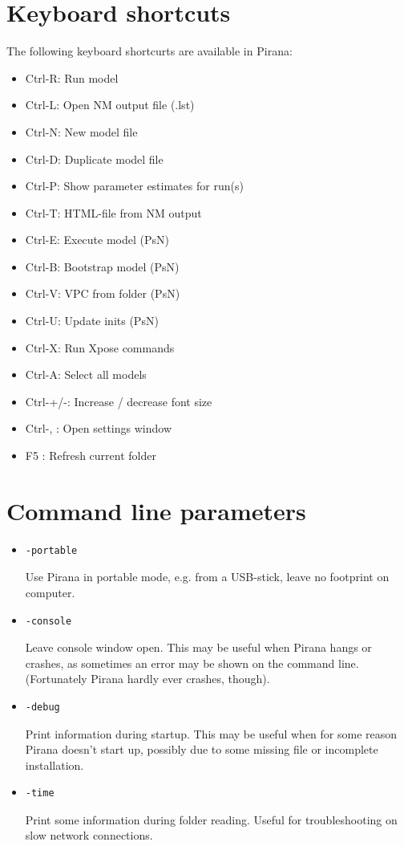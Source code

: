 {{{{\section{Keyboard shortcuts}
The following keyboard shortcurts are available in Pirana:
\begin{itemize}[noitemsep,topsep=5pt,parsep=1pt,partopsep=0pt]
  \item        Ctrl-R: Run model
  \item        Ctrl-L: Open NM output file (.lst)
  \item        Ctrl-N: New model file
  \item        Ctrl-D: Duplicate model file
  \item        Ctrl-P: Show parameter estimates for run(s)
  \item        Ctrl-T: HTML-file from NM output
  \item        Ctrl-E: Execute model (PsN)
  \item        Ctrl-B: Bootstrap model (PsN)
  \item        Ctrl-V: VPC from folder (PsN)
  \item        Ctrl-U: Update inits (PsN)
  \item        Ctrl-X: Run Xpose commands
  \item        Ctrl-A: Select all models
  \item        Ctrl-+/-: Increase / decrease font size
  \item        Ctrl-, : Open settings window
  \item        F5 : Refresh current folder
\end{itemize}

\clearpage
\section{Command line parameters}

\begin{itemize}[noitemsep,topsep=5pt,parsep=1pt,partopsep=0pt]
  \item   \begin{verbatim}-portable\end{verbatim} Use Pirana in portable mode, e.g. from a USB-stick, leave no footprint on computer.
  \item   \begin{verbatim}-console\end{verbatim} Leave console window
    open. This may be useful when Pirana hangs or crashes, as
    sometimes an error may be shown on the command line. (Fortunately
    Pirana hardly ever crashes, though).
  \item \begin{verbatim}-debug\end{verbatim} Print information during
    startup. This may be useful when for some reason Pirana doesn't
    start up, possibly due to some missing file or incomplete
    installation.
  \item \begin{verbatim}-time\end{verbatim} Print some information during
    folder reading. Useful for troubleshooting on slow network connections.
\end{itemize}

}}}}
